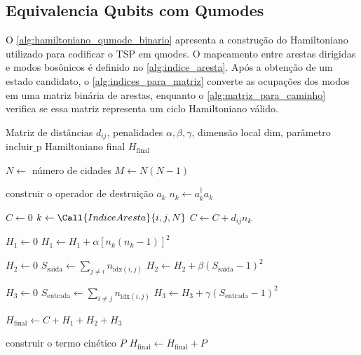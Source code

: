 \begin{apendicesenv}
\subsection{Equivalencia Qubits com Qumodes}

O \autoref{alg:hamiltoniano_qumode_binario} apresenta a construção do Hamiltoniano utilizado para codificar o TSP em qmodes. O mapeamento entre arestas dirigidas e modos bosônicos é definido no \autoref{alg:indice_aresta}. Após a obtenção de um estado candidato, o \autoref{alg:indices_para_matriz} converte as ocupações dos modos em uma matriz binária de arestas, enquanto o \autoref{alg:matriz_para_caminho} verifica se essa matriz representa um ciclo Hamiltoniano válido.

\begin{algorithm}[htbp]
\caption{Construção do Hamiltoniano qumode-binário para o TSP}
\label{alg:hamiltoniano_qumode_binario}
\begin{algorithmic}[1]
\Require Matriz de distâncias $d_{ij}$, penalidades $\alpha,\beta,\gamma$, dimensão local $\mathrm{dim}$, parâmetro $\mathrm{incluir\_p}$
\Ensure Hamiltoniano final $H_{\mathrm{final}}$

\State $N \gets$ número de cidades
\State $M \gets N(N-1)$ 

    \State construir o operador de destruição $a_k$
    \State $n_k \gets a_k^\dagger a_k$
\EndFor

\State $C \gets 0$
            \State $k \gets \Call{IndiceAresta}{i,j,N}$
            \State $C \gets C + d_{ij}n_k$
        \EndIf
    \EndFor
\EndFor

\State $H_1 \gets 0$
    \State $H_1 \gets H_1 + \alpha\left[n_k(n_k-1)\right]^2$
\EndFor

\State $H_2 \gets 0$
    \State $S_{\mathrm{saida}} \gets \sum_{j \neq i} n_{\mathrm{idx}(i,j)}$
    \State $H_2 \gets H_2 + \beta(S_{\mathrm{saida}}-1)^2$
\EndFor

\State $H_3 \gets 0$
    \State $S_{\mathrm{entrada}} \gets \sum_{i \neq j} n_{\mathrm{idx}(i,j)}$
    \State $H_3 \gets H_3 + \gamma(S_{\mathrm{entrada}}-1)^2$
\EndFor

\State $H_{\mathrm{final}} \gets C + H_1 + H_2 + H_3$

    \State construir o termo cinético $P$
    \State $H_{\mathrm{final}} \gets H_{\mathrm{final}} + P$
\EndIf


\end{algorithmic}
\end{algorithm}
\end{apendicesenv}
